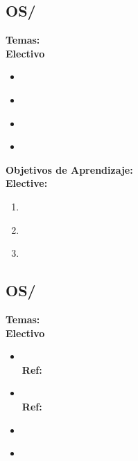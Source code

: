 \subsection{OS/\OSRealTimeandEmbeddedSystems}\label{sec:BOK:OSRealTimeandEmbeddedSystems}
\noindent \textbf{Temas:}\\
\noindent \textbf{Electivo}
\begin{itemize}
	\item \OSRealTimeandEmbeddedSystemsTopicProcess\label{sec:BOK:OSRealTimeandEmbeddedSystemsTopicProcess}
	\item \OSRealTimeandEmbeddedSystemsTopicMemoryDisk\label{sec:BOK:OSRealTimeandEmbeddedSystemsTopicMemoryDisk}
	\item \OSRealTimeandEmbeddedSystemsTopicFailures\label{sec:BOK:OSRealTimeandEmbeddedSystemsTopicFailures}
	\item \OSRealTimeandEmbeddedSystemsTopicSpecialConcerns\label{sec:BOK:OSRealTimeandEmbeddedSystemsTopicSpecialConcerns}
\end{itemize}


\noindent \textbf{Objetivos de Aprendizaje:}\\
\noindent \textbf{Elective:}
\begin{enumerate}
	\setcounter{enumi}{0}
	\item \OSRealTimeandEmbeddedSystemsLODescribeWhatSystem\xspace[\OSRealTimeandEmbeddedSystemsLODescribeWhatSystemLevel]\label{sec:BOK:OSRealTimeandEmbeddedSystemsLODescribeWhatSystem}
	\item \OSRealTimeandEmbeddedSystemsLOExplainTheAnd\xspace[\OSRealTimeandEmbeddedSystemsLOExplainTheAndLevel]\label{sec:BOK:OSRealTimeandEmbeddedSystemsLOExplainTheAnd}
	\item \OSRealTimeandEmbeddedSystemsLOSummarizeSpecial\xspace[\OSRealTimeandEmbeddedSystemsLOSummarizeSpecialLevel]\label{sec:BOK:OSRealTimeandEmbeddedSystemsLOSummarizeSpecial}
\end{enumerate}


\subsection{OS/\OSFaultTolerance}\label{sec:BOK:OSFaultTolerance}
\noindent \textbf{Temas:}\\
\noindent \textbf{Electivo}
\begin{itemize}
	\item \OSFaultToleranceTopicFundamental\xspace \\ \textbf{Ref:} \label{sec:BOK:OSFaultToleranceTopicFundamental}
	\item \OSFaultToleranceTopicSpatial\xspace \\ \textbf{Ref:} \label{sec:BOK:OSFaultToleranceTopicSpatial}
	\item \OSFaultToleranceTopicMethods\label{sec:BOK:OSFaultToleranceTopicMethods}
	\item \OSFaultToleranceTopicExamples\label{sec:BOK:OSFaultToleranceTopicExamples}
\end{itemize}


